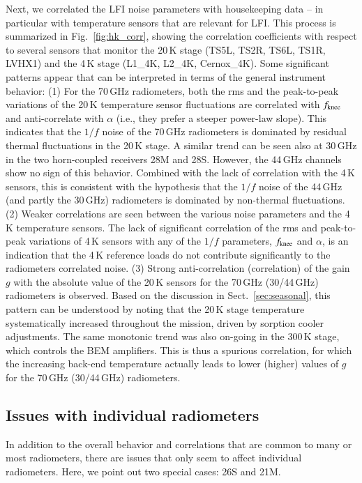 \documentclass{aa}
\begin{document}
Next, we correlated the LFI noise parameters with housekeeping data --
in particular with temperature sensors that are relevant for LFI. This
process is summarized in Fig.~\ref{fig:hk_corr}, showing the correlation
coefficients with respect to several sensors that monitor the 20\,K
stage (TS5L, TS2R, TS6L, TS1R, LVHX1) and the 4\,K stage (L1\_4K,
L2\_4K, Cernox\_4K).
Some significant patterns appear that can be interpreted in terms of
the general instrument behavior:
(1) For the 70\,GHz radiometers, both the rms and the peak-to-peak
        variations of the 20\,K temperature sensor fluctuations 
        are correlated with $f_{\rm knee}$ and anti-correlate with $\alpha$
        (i.e., they prefer a steeper power-law slope).  This indicates that the $1/f$
        noise of the 70\,GHz radiometers is dominated by residual
        thermal fluctuations in the 20\,K stage. A similar trend can
        be seen also at 30\,GHz in the two horn-coupled receivers 28M
        and 28S. However, the 44\,GHz channels show no
        sign of this behavior. 
        Combined with the lack of correlation with the 4\,K
        sensors, this is consistent with the hypothesis that the $1/f$ noise
        of the 44\,GHz (and partly the 30\,GHz) radiometers is dominated by
        non-thermal fluctuations. (2) Weaker correlations are seen between the various noise parameters and the
        4\,K temperature sensors. The lack of significant correlation of the rms and peak-to-peak variations of 4\,K sensors with any of the $1/f$ parameters, $f_{\rm knee}$ and  $\alpha$, is an indication that the 4\,K reference loads do not contribute significantly to the radiometers correlated noise. (3) Strong anti-correlation (correlation) of the gain $g$ with
        the absolute value of the 20\,K sensors for the 70\,GHz
        (30/44\,GHz) radiometers is observed. Based on the discussion
        in Sect.~\ref{sec:seasonal}, this pattern can be understood by
        noting that the 20\,K stage temperature systematically
        increased throughout the mission, driven by sorption cooler
        adjustments. The same monotonic trend was also on-going in the
        300\,K stage, which controls the BEM amplifiers. This is thus a
        spurious correlation, for which the increasing back-end
        temperature actually leads to lower (higher) values of $g$ for
        the 70\,GHz (30/44\,GHz) radiometers.


\subsection{Issues with individual radiometers}
In addition to the overall behavior and correlations that are common to many or most radiometers,
there are issues that only seem to affect individual radiometers. Here, we point out two special cases: 26S and 21M. 
\end{document}
